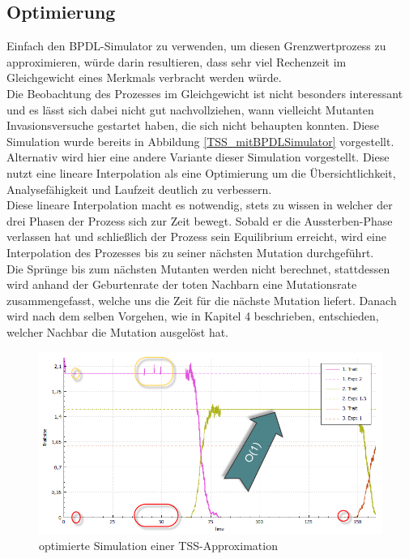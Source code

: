 \documentclass[11pt, a4paper, german]{article}
\theoremstyle{plain}
\begin{document}
	\subsection{Optimierung}
	Einfach den BPDL-Simulator zu verwenden, um diesen Grenzwertprozess zu approximieren, würde darin resultieren, dass sehr viel Rechenzeit im Gleichgewicht eines Merkmals verbracht werden würde.\\
	Die Beobachtung des Prozesses im Gleichgewicht ist nicht besonders interessant und es lässt sich dabei nicht gut nachvollziehen, wann vielleicht Mutanten Invasionsversuche gestartet haben, die sich nicht behaupten konnten. Diese Simulation wurde bereits in Abbildung \ref{TSS_mitBPDLSimulator} vorgestellt.\\
	Alternativ wird hier eine andere Variante dieser Simulation vorgestellt. 
	Diese nutzt eine lineare Interpolation als eine Optimierung um die Übersichtlichkeit, Analysefähigkeit und Laufzeit deutlich zu verbessern.\\
	Diese lineare Interpolation macht es notwendig, stets zu wissen in welcher der drei Phasen der Prozess sich zur Zeit bewegt. Sobald er die Aussterben-Phase verlassen hat und schließlich der Prozess sein Equilibrium erreicht, wird eine Interpolation des Prozesses bis zu seiner nächsten Mutation durchgeführt.\\
	Die Sprünge bis zum nächsten Mutanten werden nicht berechnet, stattdessen wird anhand der Geburtenrate der toten Nachbarn eine Mutationsrate zusammengefasst, welche uns die Zeit für die nächste Mutation liefert. Danach wird nach dem selben Vorgehen, wie in Kapitel 4 beschrieben, entschieden, welcher Nachbar die Mutation ausgelöst hat.\\
	\begin{figure}[H]
		\centering
		\includegraphics[width=1\linewidth]{./Pictures/TSS2_optimierung_small}
		\caption[MainWindow_redGreenFitness]{optimierte Simulation einer TSS-Approximation}
		\label{TSS2_optimierung_small}
	\end{figure}
\end{document}
